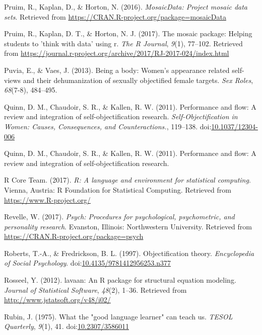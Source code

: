 \documentclass[
  man]{apa6}
\begin{document}
\leavevmode\hypertarget{ref-R-mosaicData}{}%
Pruim, R., Kaplan, D., \& Horton, N. (2016). \emph{MosaicData: Project mosaic data sets}. Retrieved from \url{https://CRAN.R-project.org/package=mosaicData}

\leavevmode\hypertarget{ref-R-mosaic}{}%
Pruim, R., Kaplan, D. T., \& Horton, N. J. (2017). The mosaic package: Helping students to 'think with data' using r. \emph{The R Journal}, \emph{9}(1), 77--102. Retrieved from \url{https://journal.r-project.org/archive/2017/RJ-2017-024/index.html}

\leavevmode\hypertarget{ref-puvia2013being}{}%
Puvia, E., \& Vaes, J. (2013). Being a body: Women's appearance related self-views and their dehumanization of sexually objectified female targets. \emph{Sex Roles}, \emph{68}(7-8), 484--495.

\leavevmode\hypertarget{ref-quinnetal}{}%
Quinn, D. M., Chaudoir, S. R., \& Kallen, R. W. (2011). Performance and flow: A review and integration of self-objectification research. \emph{Self-Objectification in Women: Causes, Consequences, and Counteractions.}, 119--138. doi:\href{https://doi.org/10.1037/12304-006}{10.1037/12304-006}

\leavevmode\hypertarget{ref-quinn2011performance}{}%
Quinn, D. M., Chaudoir, S. R., \& Kallen, R. W. (2011). Performance and flow: A review and integration of self-objectification research.

\leavevmode\hypertarget{ref-R-base}{}%
R Core Team. (2017). \emph{R: A language and environment for statistical computing}. Vienna, Austria: R Foundation for Statistical Computing. Retrieved from \url{https://www.R-project.org/}

\leavevmode\hypertarget{ref-R-psych}{}%
Revelle, W. (2017). \emph{Psych: Procedures for psychological, psychometric, and personality research}. Evanston, Illinois: Northwestern University. Retrieved from \url{https://CRAN.R-project.org/package=psych}

\leavevmode\hypertarget{ref-robertsfredrickson}{}%
Roberts, T.-A., \& Fredrickson, B. L. (1997). Objectification theory. \emph{Encyclopedia of Social Psychology}. doi:\href{https://doi.org/10.4135/9781412956253.n377}{10.4135/9781412956253.n377}

\leavevmode\hypertarget{ref-R-lavaan}{}%
Rosseel, Y. (2012). lavaan: An R package for structural equation modeling. \emph{Journal of Statistical Software}, \emph{48}(2), 1--36. Retrieved from \url{http://www.jstatsoft.org/v48/i02/}

\leavevmode\hypertarget{ref-rubin1975}{}%
Rubin, J. (1975). What the "good language learner" can teach us. \emph{TESOL Quarterly}, \emph{9}(1), 41. doi:\href{https://doi.org/10.2307/3586011}{10.2307/3586011}
\end{document}

